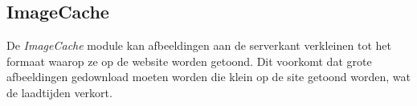 \subsection{ImageCache}\label{imagecache}

De \textit{ImageCache} module kan afbeeldingen aan de serverkant verkleinen tot het formaat waarop ze op de website worden getoond. Dit voorkomt dat grote afbeeldingen gedownload moeten worden die klein op de site getoond worden, wat de laadtijden verkort.
